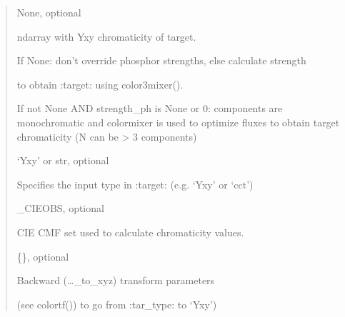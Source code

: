 \documentclass[letterpaper,10pt,english]{sphinxmanual}
\begin{document}
\begin{fulllineitems}
\begin{description}
\begin{quote}
\begin{description}
\item[{target}] \leavevmode
\begin{DUlineblock}{0em}
\item[] None, optional
\item[] ndarray with Yxy chromaticity of target.
\item[]
\begin{DUlineblock}{\DUlineblockindent}
\item[] If None: don’t override phosphor strengths, else calculate strength
\item[]
\begin{DUlineblock}{\DUlineblockindent}
\item[] to obtain :target: using color3mixer().
\end{DUlineblock}
\end{DUlineblock}
\item[] If not None AND strength\_ph is None or 0: components are 
monochromatic and colormixer is used to optimize fluxes to 
obtain target chromaticity (N can be \textgreater{} 3 components)
\end{DUlineblock}

\item[{tar\_type}] \leavevmode
\begin{DUlineblock}{0em}
\item[] ‘Yxy’ or str, optional
\item[] Specifies the input type in :target: (e.g. ‘Yxy’ or ‘cct’)
\end{DUlineblock}

\item[{cieobs}] \leavevmode
\begin{DUlineblock}{0em}
\item[] \_CIEOBS, optional
\item[] CIE CMF set used to calculate chromaticity values.
\end{DUlineblock}

\item[{cspace\_bwtf}] \leavevmode
\begin{DUlineblock}{0em}
\item[] \{\}, optional
\item[] Backward (…\_to\_xyz) transform parameters 
\item[] (see colortf()) to go from :tar\_type: to ‘Yxy’)
\end{DUlineblock}

\end{description}\end{quote}


\end{description}
\end{fulllineitems}
\end{document}
